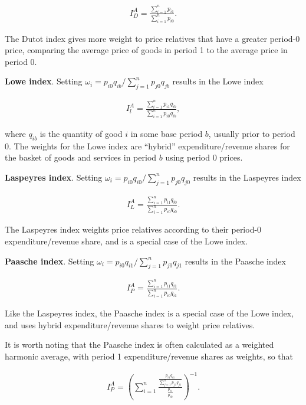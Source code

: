 \documentclass[]{article}
\begin{document}
\begin{align*}
I^{A}_D = \frac{\sum_{i = 1}^{n} p_{i1}}{\sum_{i = 1}^{n} p_{i0}}.
\end{align*}

The Dutot index gives more weight to price relatives that have a greater period-0 price, comparing the average price of goods in period 1 to the average price in period 0.

\textbf{Lowe index}. Setting \(\omega_{i} = p_{i0} q_{ib} / \sum_{j = 1}^{n} p_{j0} q_{jb}\) results in the Lowe index

\begin{align*}
I^{A}_{l} = \frac{\sum_{i = 1}^{n} p_{i1} q_{ib}}{\sum_{i = 1}^{n} p_{i0} q_{ib}},
\end{align*}

where \(q_{ib}\) is the quantity of good \(i\) in some base period \(b\), usually prior to period 0. The weights for the Lowe index are ``hybrid'' expenditure/revenue shares for the basket of goods and services in period \(b\) using period 0 prices.

\textbf{Laspeyres index}. Setting \(\omega_{i} = p_{i0} q_{i0} / \sum_{j = 1}^{n} p_{j0} q_{j0}\) results in the Laspeyres index

\begin{align*}
I^{A}_{L} = \frac{\sum_{i = 1}^{n} p_{i1} q_{i0}}{\sum_{i = 1}^{n} p_{i0} q_{i0}}.
\end{align*}

The Laspeyres index weights price relatives according to their period-0 expenditure/revenue share, and is a special case of the Lowe index.

\textbf{Paasche index}. Setting \(\omega_{i} = p_{i0} q_{i1} / \sum_{j = 1}^{n} p_{j0} q_{j1}\) results in the Paasche index

\begin{align*}
I^{A}_{P} = \frac{\sum_{i = 1}^{n} p_{i1} q_{i1}}{\sum_{i = 1}^{n} p_{i0} q_{i1}}.
\end{align*}

Like the Laspeyres index, the Paasche index is a special case of the Lowe index, and uses hybrid expenditure/revenue shares to weight price relatives.

It is worth noting that the Paasche index is often calculated as a weighted harmonic average, with period 1 expenditure/revenue shares as weights, so that

\begin{align*}
I^{A}_{P} = \left(\sum_{i = 1}^{n} \frac{\frac{p_{i1} q_{i1}}{\sum_{j = 1}^{n} p_{j1} q_{j1}}}{\frac{p_{i1}}{p_{i0}}}\right)^{-1}.
\end{align*}
\end{document}

